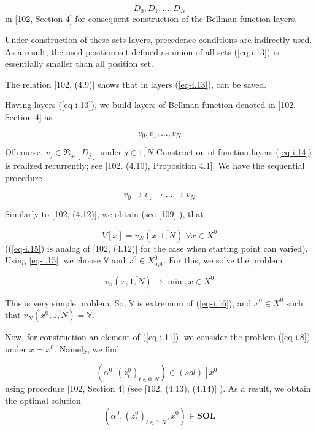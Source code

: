 \documentclass{article}
\begin{document}
\begin{equation}
  \label{eq-i.13}
  D_0, D_1, \dots , D_N
\end{equation}
in
[102, Section 4]  %
for consequent construction of the Bellman function layers.

Under construction of these sets-layers,
precedence conditions are indirectly used.
As a result,
the used position set defined as union of all sets (\ref{eq-i.13})
is essentially smaller than all position set.

The relation
[102, (4.9)]  %
shows that in layers (\ref{eq-i.13}),
can be saved.

Having layers (\ref{eq-i.13}),
we build layers of Bellman function denoted in
[102, Section 4]  %
as

\begin{equation}
  \label{eq-i.14}
  v_0, v_1, \dots , v_N
\end{equation}

Of course,
$v_j \in \mathfrak R_+[D_j]$
under
$j \in \overline{1,N}$
Construction of function-layers (\ref{eq-i.14})
is realized recurrently;
see
[102. (4.10), Proposition 4.1].   %
We have the sequential procedure

\begin{equation*}
  v_0 \to v_1 \to \dots \to v_N
\end{equation*}

Similarly to
[102, (4.12)], %
we obtain
(see
[109] %
),
that

\begin{equation}
  \label{eq-i.15}
  \tilde{V}[x] = v_N(x, \overline{1,N})
  \;
  \forall x \in X^0
\end{equation}
((\ref{eq-i.15})
is analog of
[102, (4.12)]   %
for the case when starting point can varied).
Using \ref{eq-i.15},
we choose
$\mathbb V$
and
$x^0 \in X^0_{\mathrm{opt}}$.
For this,
we solve the problem

\begin{equation}
  \label{eq-i.16}
  v_n(x, \overline{1,N}) \to \min,
  x \in X^0
\end{equation}

This is very simple problem.
So,
$\mathbb V$
is extremum of (\ref{eq-i.16}),
and
$x^0 \in X^0$
such that
$v_N(x^0, \overline{1,N}) = \mathbb V$.

Now, for construction an element of (\ref{eq-i.11}),
we consider the problem (\ref{eq-i.8})
under
$x=x^0$.
Namely,
we find

\begin{equation*}
  (\alpha^0, (z_t^0)_{t\in \overline{0,N}}) \in
  (sol)[x^0]
\end{equation*}
using procedure
[102, Section 4]  %
(see
[102, (4.13), (4.14)] %
).
As a result,
we obtain the optimal solution
\begin{equation*}
  (\alpha^0, (z_t^0)_{t\in \overline{0,N}}, x^0)
  \in \mathbf{SOL}
\end{equation*}
\end{document}

